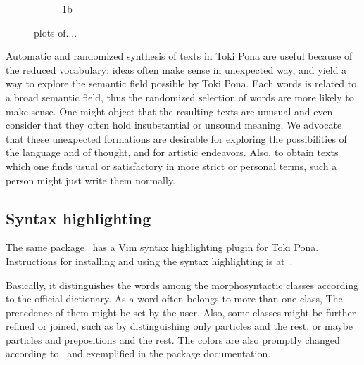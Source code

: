 \documentclass{article}
\begin{document}
\begin{figure}
\begin{subfigure}{.5\textwidth}
          \caption{1b}
            \label{fig:sfig2}
  \end{subfigure}
  \caption{plots of....}
  \label{fig:fig}
\end{figure}

Automatic and randomized synthesis of texts in Toki Pona are
useful because of the reduced vocabulary: ideas often make
sense in unexpected way, and yield a way to 
explore the semantic field possible by Toki Pona.
Each words is related to a broad semantic field,
thus the randomized selection of words are more likely
to make sense.
One might object that the resulting texts are unusual 
and even consider that they often hold insubstantial or unsound meaning.
We advocate that these unexpected formations are desirable
for exploring the possibilities of the language and of thought,
and for artistic endeavors.
Also, to obtain texts which one finds usual or satisfactory
in more strict or personal terms, such a person might just write
them normally.



\subsection{Syntax highlighting}\label{shigh}
The same package~\cite{tokipona}
has a Vim syntax highlighting plugin
for Toki Pona.
Instructions for installing and using
the syntax highlighting is at~\cite{tokipona}.

Basically, it distinguishes the words among the morphosyntactic
classes according to the official dictionary.
As a word often belongs to more than one class,
The precedence of them might be set by the user.
Also, some classes might be further refined or joined,
such as by distinguishing only particles and the rest,
or maybe particles and prepositions and the rest.
The colors are also promptly changed according to~\cite{vimArt}
and exemplified in the package documentation.
\end{document}
